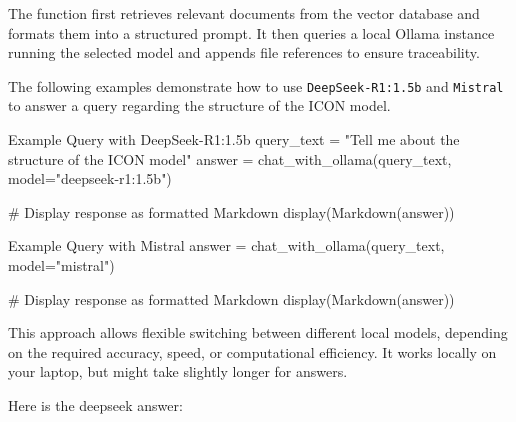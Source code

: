 The function first retrieves relevant documents from the vector database and formats them into a structured prompt. 
It then queries a local Ollama instance running the selected model and appends file references to ensure traceability.

The following examples demonstrate how to use \texttt{DeepSeek-R1:1.5b} and \texttt{Mistral} to answer a query 
regarding the structure of the ICON model.

\begin{codeonly}{Example Query with DeepSeek-R1:1.5b}
query_text = "Tell me about the structure of the ICON model"
answer = chat_with_ollama(query_text, model="deepseek-r1:1.5b")

# Display response as formatted Markdown
display(Markdown(answer))
\end{codeonly}

\begin{codeonly}{Example Query with Mistral}
answer = chat_with_ollama(query_text, model="mistral")

# Display response as formatted Markdown
display(Markdown(answer))
\end{codeonly}

This approach allows flexible switching between different local models, depending on the required accuracy, speed, or computational efficiency. It works locally on your laptop, but might take slightly longer for answers. 

Here is the deepseek answer: 

